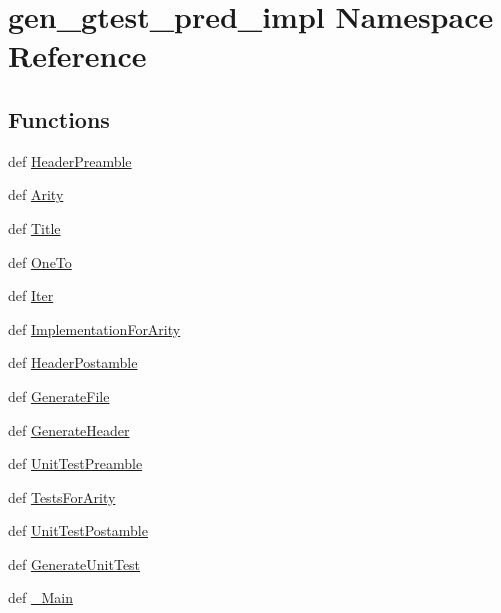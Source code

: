 \hypertarget{namespacegen__gtest__pred__impl}{\section{gen\-\_\-gtest\-\_\-pred\-\_\-impl \-Namespace \-Reference}
\label{d0/db7/namespacegen__gtest__pred__impl}
}
\subsection*{\-Functions}
\begin{DoxyCompactItemize}
\item 
def \hyperlink{namespacegen__gtest__pred__impl_a94611cbb902fe725a0c566bd0d9c0817}{\-Header\-Preamble}
\item 
def \hyperlink{namespacegen__gtest__pred__impl_a017b437499e68412572fc726edf8ddd2}{\-Arity}
\item 
def \hyperlink{namespacegen__gtest__pred__impl_a629029b6fef00578cb886c7eca25cf67}{\-Title}
\item 
def \hyperlink{namespacegen__gtest__pred__impl_a369482efbd71b1ddf21a4a520e8769b4}{\-One\-To}
\item 
def \hyperlink{namespacegen__gtest__pred__impl_a230080bd07390d99521308904d7f6e3c}{\-Iter}
\item 
def \hyperlink{namespacegen__gtest__pred__impl_a7334eb8b396d40c01c9bbd64a63c8ce1}{\-Implementation\-For\-Arity}
\item 
def \hyperlink{namespacegen__gtest__pred__impl_a3741b573bde4a614f34aa55587292c5f}{\-Header\-Postamble}
\item 
def \hyperlink{namespacegen__gtest__pred__impl_a996717114b48d38f2ff2722070d70188}{\-Generate\-File}
\item 
def \hyperlink{namespacegen__gtest__pred__impl_a7392ee5b86f41d4c66fd496ac5e53da2}{\-Generate\-Header}
\item 
def \hyperlink{namespacegen__gtest__pred__impl_ad34b57e3bcbd48ecc394398a7b71b267}{\-Unit\-Test\-Preamble}
\item 
def \hyperlink{namespacegen__gtest__pred__impl_a6e2865e6f6be1dd3a691320e1e8fda0f}{\-Tests\-For\-Arity}
\item 
def \hyperlink{namespacegen__gtest__pred__impl_a610d36b8a024985a2a80f9244eb61902}{\-Unit\-Test\-Postamble}
\item 
def \hyperlink{namespacegen__gtest__pred__impl_af6ebf6710b82cd16112ecdf75a751952}{\-Generate\-Unit\-Test}
\item 
def \hyperlink{namespacegen__gtest__pred__impl_ad4c8f98be21aec3cac96f82b32cae356}{\-\_\-\-Main}
\end{DoxyCompactItemize}
